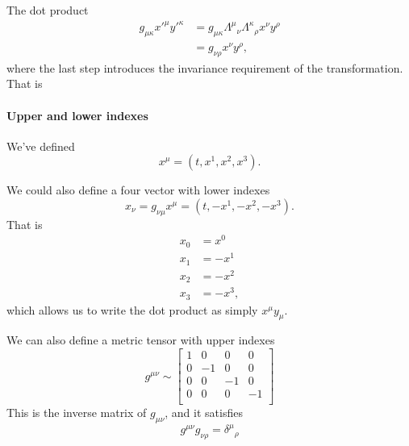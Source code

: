 The dot product
\begin{equation}\label{eqn:qftLecture2:620}
\begin{aligned}
g_{\mu \kappa}
{x'}^\mu
{y'}^\kappa
&=
g_{\mu \kappa}
{\Lambda^\mu}_\nu
{\Lambda^\kappa}_\rho
x^\nu
y^\rho \\
&=
g_{\nu\rho}
x^\nu
y^\rho,
\end{aligned}
\end{equation}
where the last step introduces the invariance requirement of the transformation.  That is
\paragraph{Upper and lower indexes}
We've defined
\begin{equation}\label{eqn:qftLecture2:660}
x^\mu = (t, x^1, x^2, x^3).
\end{equation}

We could also define a four vector with lower indexes
\begin{equation}\label{eqn:qftLecture2:680}
x_\nu = g_{\nu\mu} x^\mu = (t, -x^1, -x^2, -x^3).
\end{equation}
That is
\begin{equation}\label{eqn:qftLecture2:700}
\begin{aligned}
x_0 &= x^0 \\
x_1 &= -x^1 \\
x_2 &= -x^2 \\
x_3 &= -x^3,
\end{aligned}
\end{equation}
which allows us to write the dot product as simply \( x^\mu y_\mu \).

We can also define a metric tensor with upper indexes
\begin{equation}\label{eqn:qftLecture2:401}
g^{\mu\nu} \sim
\begin{bmatrix}
1 & 0 & 0 & 0 \\
0 & -1 & 0 & 0 \\
0 & 0 & -1 & 0 \\
0 & 0 & 0 & -1 \\
\end{bmatrix}
\end{equation}
This is the inverse matrix of \( g_{\mu\nu} \), and it satisfies
\begin{equation}\label{eqn:qftLecture2:720}
g^{\mu \nu} g_{\nu\rho} = {\delta^\mu}_\rho
\end{equation}

